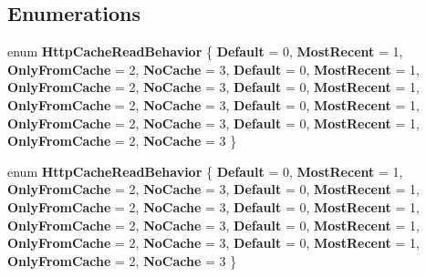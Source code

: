 \subsection*{Enumerations}
\begin{DoxyCompactItemize}
\item 
\mbox{\label{namespace_windows_1_1_web_1_1_http_1_1_filters_a48b2ac096c830c3e320549dc7073620e}} 
enum {\bfseries Http\+Cache\+Read\+Behavior} \{ \newline
{\bfseries Default} = 0, 
{\bfseries Most\+Recent} = 1, 
{\bfseries Only\+From\+Cache} = 2, 
{\bfseries No\+Cache} = 3, 
\newline
{\bfseries Default} = 0, 
{\bfseries Most\+Recent} = 1, 
{\bfseries Only\+From\+Cache} = 2, 
{\bfseries No\+Cache} = 3, 
\newline
{\bfseries Default} = 0, 
{\bfseries Most\+Recent} = 1, 
{\bfseries Only\+From\+Cache} = 2, 
{\bfseries No\+Cache} = 3, 
\newline
{\bfseries Default} = 0, 
{\bfseries Most\+Recent} = 1, 
{\bfseries Only\+From\+Cache} = 2, 
{\bfseries No\+Cache} = 3, 
\newline
{\bfseries Default} = 0, 
{\bfseries Most\+Recent} = 1, 
{\bfseries Only\+From\+Cache} = 2, 
{\bfseries No\+Cache} = 3
 \}
\item 
\mbox{\label{namespace_windows_1_1_web_1_1_http_1_1_filters_a48b2ac096c830c3e320549dc7073620e}} 
enum {\bfseries Http\+Cache\+Read\+Behavior} \{ \newline
{\bfseries Default} = 0, 
{\bfseries Most\+Recent} = 1, 
{\bfseries Only\+From\+Cache} = 2, 
{\bfseries No\+Cache} = 3, 
\newline
{\bfseries Default} = 0, 
{\bfseries Most\+Recent} = 1, 
{\bfseries Only\+From\+Cache} = 2, 
{\bfseries No\+Cache} = 3, 
\newline
{\bfseries Default} = 0, 
{\bfseries Most\+Recent} = 1, 
{\bfseries Only\+From\+Cache} = 2, 
{\bfseries No\+Cache} = 3, 
\newline
{\bfseries Default} = 0, 
{\bfseries Most\+Recent} = 1, 
{\bfseries Only\+From\+Cache} = 2, 
{\bfseries No\+Cache} = 3, 
\newline
{\bfseries Default} = 0, 
{\bfseries Most\+Recent} = 1, 
{\bfseries Only\+From\+Cache} = 2, 
{\bfseries No\+Cache} = 3
 \}
\item 
\mbox{\label{namespace_windows_1_1_web_1_1_http_1_1_filters_a48b2ac096c830c3e320549dc7073620e}} 

\end{DoxyCompactItemize}
